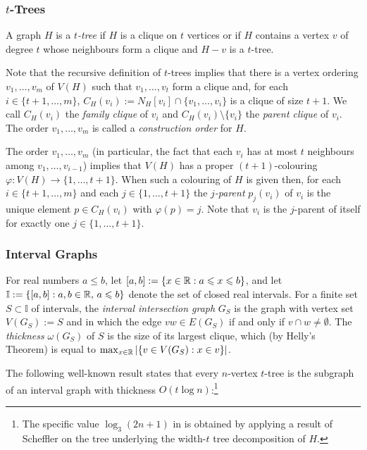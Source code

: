 \documentclass[kpfonts]{patmorin}
\let\le\leqslant
\begin{document}
\subsubsection{$t$-Trees}

A graph $H$ is a \emph{$t$-tree} if $H$ is a clique on $t$ vertices or if $H$ contains a vertex $v$ of degree $t$ whose neighbours form a clique and $H-v$ is a $t$-tree.  

Note that the recursive definition of $t$-trees implies that there is a vertex ordering $v_1,\ldots,v_{m}$ of $V(H)$ such that $v_1,\ldots,v_t$ form a clique and, for each $i\in\{t+1,\ldots,m\}$, $C_H(v_i):=N_H[v_i]\cap \{v_1,\ldots,v_{i}\}$ is a clique of size $t+1$.  We call $C_H(v_i)$ the \emph{family clique} of $v_i$ and $C_H(v_i)\setminus\{v_i\}$ the \emph{parent clique} of $v_i$.  The order $v_1,\ldots,v_m$ is called a \emph{construction order} for $H$.

The order $v_1,\ldots,v_m$ (in particular, the fact that each $v_i$ has at most $t$ neighbours among $v_1,\ldots,v_{i-1}$) implies that $V(H)$ has a proper $(t+1)$-colouring $\varphi:V(H)\to\{1,\ldots,t+1\}$.  When such a colouring of $H$ is given then, for each $i\in\{t+1,\ldots,m\}$ and each $j\in\{1,\ldots,t+1\}$ the \emph{$j$-parent} $p_j(v_i)$ of $v_i$ is the unique element $p\in C_H(v_i)$ with $\varphi(p)=j$.  Note that $v_i$ is the $j$-parent of itself for exactly one $j\in\{1,\ldots,t+1\}$.

\subsubsection{Interval Graphs}

For real numbers $a\le b$, let $[a,b]:=\{ x\in\R: a\le x\le b\}$, and let
$\mathbb{I}:=\{[a,b]: a,b\in\R,\, a\le b\}$ denote the set of closed real intervals.  For a finite set $S\subset\mathbb{I}$ of intervals, the \emph{interval intersection graph} $G_S$ is the graph with vertex set $V(G_S):=S$ and in which the edge $vw\in E(G_S)$ if and only if $v\cap w\neq \emptyset$.  The \emph{thickness} $\omega(G_S)$ of $S$ is the size of its largest clique, which (by Helly's Theorem) is equal to $\max_{x\in\mathbb{R}}|\{v\in V(G_S):x\in v\}|$.  


The following well-known result states that every $n$-vertex $t$-tree is the subgraph of an interval graph with thickness $O(t\log n)$:\footnote{The specific value $\log_3 (2n+1)$ in  is obtained by applying a result of Scheffler \cite{scheffler:optimal} on the tree underlying the width-$t$ tree decomposition of $H$.}
\end{document}
